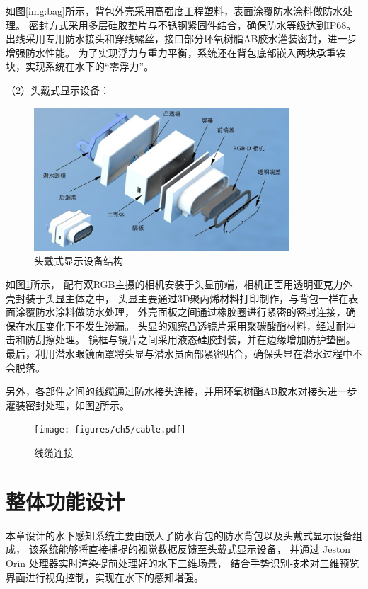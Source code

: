 如图\ref{img:bag}所示，背包外壳采用高强度工程塑料，表面涂覆防水涂料做防水处理。
密封方式采用多层硅胶垫片与不锈钢紧固件结合，确保防水等级达到IP68。
出线采用专用防水接头和穿线螺丝，接口部分环氧树脂AB胶水灌装密封，进一步增强防水性能。
为了实现浮力与重力平衡，系统还在背包底部嵌入两块承重铁块，实现系统在水下的“零浮力”。

（2）头戴式显示设备：
\begin{figure}[h]
    \centering
    \includegraphics[width=0.85\textwidth]{figures/ch5/headscreen.jpg}
    \caption{头戴式显示设备结构}
    \label{img:camera}
\end{figure}

如图\ref{img:camera}所示，
配有双RGB主摄的相机安装于头显前端，相机正面用透明亚克力外壳封装于头显主体之中，
头显主要通过3D聚丙烯材料打印制作，与背包一样在表面涂覆防水涂料做防水处理，
外壳面板之间通过橡胶圈进行紧密的密封连接，确保在水压变化下不发生渗漏。
头显的观察凸透镜片采用聚碳酸酯材料，经过耐冲击和防刮擦处理。
镜框与镜片之间采用液态硅胶封装，并在边缘增加防护垫圈。
最后，利用潜水眼镜面罩将头显与潜水员面部紧密贴合，确保头显在潜水过程中不会脱落。

另外，各部件之间的线缆通过防水接头连接，并用环氧树酯AB胶水对接头进一步灌装密封处理，如图\ref{img:cable}所示。
\begin{figure}[h]
    \centering
    \texttt{[image: figures/ch5/cable.pdf]} \hspace{-3.5cm}
    \caption{线缆连接}
    \label{img:cable}
\end{figure}

\section{整体功能设计}
本章设计的水下感知系统主要由嵌入了防水背包的防水背包以及头戴式显示设备组成，
该系统能够将直接捕捉的视觉数据反馈至头戴式显示设备，
并通过 Jeston Orin 处理器实时渲染提前处理好的水下三维场景，
结合手势识别技术对三维预览界面进行视角控制，实现在水下的感知增强。

